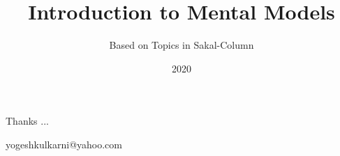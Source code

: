 \documentclass[xcolor=dvipsnames,compress,t,pdf]{beamer}
\title[\hspace{4cm} \insertframenumber /\inserttotalframenumber]
{Introduction to Mental Models}
\subtitle[]{Based on Topics in Sakal-Column}
\date{2020}
\begin{document}
\begin{frame}
\titlepage
\end{frame}


\begin{frame}[c]{}
Thanks ...

\vspace{5mm}
yogeshkulkarni@yahoo.com
\end{frame}
\end{document}
